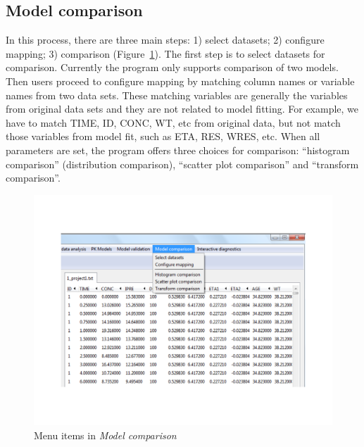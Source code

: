 \documentclass[a4paper]{article}
\begin{document}
\subsection{Model comparison}
In this process, there are three main steps: 1) select datasets; 2) configure mapping; 3) comparison (Figure~\ref{modelc}). The first step is to select datasets for comparison. Currently the program only supports comparison of two models. Then users proceed to configure mapping by matching column names or variable names from two data sets. These matching variables are generally the variables from original data sets and they are not related to model fitting. For example, we have to match TIME, ID, CONC, WT, etc from original data, but not match those variables from model fit, such as ETA, RES, WRES, etc. When all parameters are set, the program offers three choices for comparison: ``histogram comparison'' (distribution comparison), ``scatter plot comparison'' and ``transform comparison''.\begin{figure}[h!tb] \centering
\includegraphics[scale=0.6]{modelc.pdf}
\caption{Menu items in \textit{Model comparison}}
\label{modelc}
\end{figure}
\end{document}
